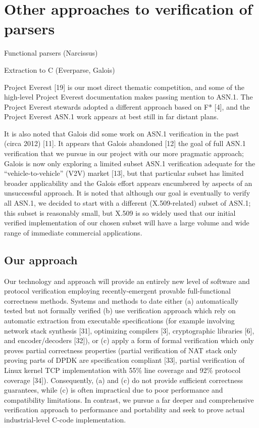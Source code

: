 \documentclass[acmsmall,nonacm]{acmart}
\begin{document}
 \section{Other approaches to verification of parsers}

  Functional parsers (Narcissus)

  Extraction to C (Everparse, Galois)

  Project Everest [19] is our most direct thematic competition, and some of the high-level Project Everest documentation makes passing mention to ASN.1. The Project Everest stewards adopted a different approach based on F* [4], and the Project Everest ASN.1 work  appears at best still in far distant plans.

It is also noted that Galois did some work on ASN.1 verification in the past (circa 2012) [11]. It appears that Galois abandoned [12] the goal of full ASN.1 verification that we pursue in our project with our more pragmatic approach; Galois is now only exploring a limited subset ASN.1 verification adequate for the “vehicle-to-vehicle” (V2V) market [13], but that particular subset has limited broader applicability and the Galois effort appears encumbered by aspects of an unsuccessful  approach. It is noted that although our goal is eventually to verify all ASN.1, we decided to start with a different (X.509-related) subset of ASN.1; this subset is reasonably small, but X.509 is so widely used that our initial verified implementation of our chosen subset will have a large volume and wide range of immediate commercial applications.

\subsection{Our approach}
  Our technology and approach will provide an entirely new level of software and protocol verification employing recently-emergent provable full-functional correctness methods.
  Systems and methods to date either (a) automatically tested but not formally verified (b) use verification approach which rely on automatic extraction from executable specifications (for example involving network stack synthesis [31], optimizing compilers [3], cryptographic libraries [6], and encoder/decoders [32]), or (c) apply a form of formal verification which only proves partial correctness properties (partial verification of NAT stack only proving parts of DPDK are specification compliant [33], partial verification of Linux kernel TCP implementation with 55\% line coverage and 92\% protocol coverage [34]). Consequently, (a) and (c) do not provide sufficient correctness guarantees, while (c) is often impractical due to poor performance and compatibility limitations. In contrast, we pursue a far deeper and comprehensive verification approach to performance and portability and seek to prove actual industrial-level C-code implementation.
\end{document}
